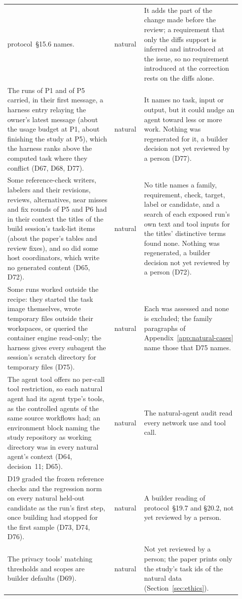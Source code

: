 \begin{longtable}{@{}p{0.44\linewidth}p{0.1\linewidth}p{0.4\linewidth}@{}}
protocol~\S15.6 names. & natural & It adds the part of the change made before the review; a requirement that only the
diffs support is inferred and introduced at the issue, so no requirement introduced at the correction rests on the
diffs alone. \\
The runs of P1 and of P5 carried, in their first message, a harness entry relaying the owner's latest message (about
the usage budget at P1, about finishing the study at P5), which the harness ranks above the computed task where they
conflict (D67, D68, D77). & natural & It names no task, input or output, but it could nudge an agent toward less or more
work. Nothing was regenerated for it, a builder decision not yet reviewed by a person (D77). \\
Some reference-check writers, labelers and their revisions, reviews, alternatives, near misses and fix rounds of P5 and
P6 had in their context the titles of the build session's task-list items (about the paper's tables and review fixes),
and so did some host coordinators, which write no generated content (D65, D72). & natural & No title names a family, requirement, check, target, label or candidate, and a search of
each exposed run's own text and tool inputs for the titles' distinctive terms found none. Nothing was regenerated, a
builder decision not yet reviewed by a person (D72). \\
Some runs worked outside the recipe: they started the task image themselves, wrote temporary files outside their
workspaces, or queried the container engine read-only; the harness gives every subagent the session's scratch directory
for temporary files (D75). & natural & Each was assessed and none is excluded; the family paragraphs of
Appendix~\ref{app:natural-cases} name those that D75 names. \\
The agent tool offers no per-call tool restriction, so each natural agent had its agent type's tools, as the controlled
agents of the same source workflows had; an environment block naming the study repository as working directory was in
every natural agent's context (D64, decision~11; D65). & natural & The natural-agent audit read every network use and
tool call. \\
D19 graded the frozen reference checks and the regression norm on every natural held-out candidate as the run's first
step, once building had stopped for the first sample (D73, D74, D76). & natural & A builder reading of protocol~\S19.7
and \S20.2, not yet reviewed by a person. \\
The privacy tools' matching thresholds and scopes are builder defaults (D69). & natural & Not yet reviewed by a person;
the paper prints only the study's task ids of the natural data (Section~\ref{sec:ethics}). \\
\end{longtable}
\endgroup
